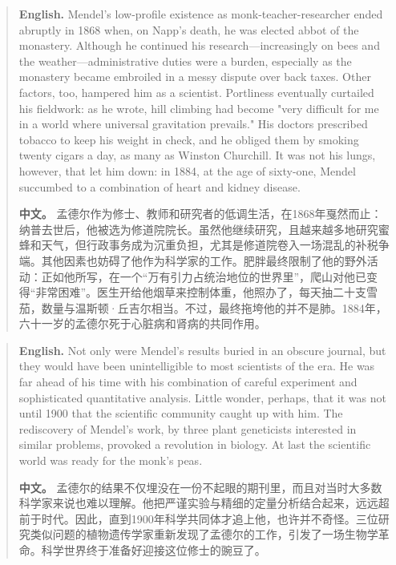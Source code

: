\begin{quote}
\noindent\textbf{English.} Mendel's low-profile existence as monk-teacher-researcher ended abruptly in 1868 when, on Napp's death, he was elected abbot of the monastery. Although he continued his research---increasingly on bees and the weather---administrative duties were a burden, especially as the monastery became embroiled in a messy dispute over back taxes. Other factors, too, hampered him as a scientist. Portliness eventually curtailed his fieldwork: as he wrote, hill climbing had become "very difficult for me in a world where universal gravitation prevails." His doctors prescribed tobacco to keep his weight in check, and he obliged them by smoking twenty cigars a day, as many as Winston Churchill. It was not his lungs, however, that let him down: in 1884, at the age of sixty-one, Mendel succumbed to a combination of heart and kidney disease.

\smallskip
\noindent\textbf{中文。} 孟德尔作为修士、教师和研究者的低调生活，在1868年戛然而止：纳普去世后，他被选为修道院院长。虽然他继续研究，且越来越多地研究蜜蜂和天气，但行政事务成为沉重负担，尤其是修道院卷入一场混乱的补税争端。其他因素也妨碍了他作为科学家的工作。肥胖最终限制了他的野外活动：正如他所写，在一个“万有引力占统治地位的世界里”，爬山对他已变得“非常困难”。医生开给他烟草来控制体重，他照办了，每天抽二十支雪茄，数量与温斯顿·丘吉尔相当。不过，最终拖垮他的并不是肺。1884年，六十一岁的孟德尔死于心脏病和肾病的共同作用。
\end{quote}

\begin{quote}
\noindent\textbf{English.} Not only were Mendel's results buried in an obscure journal, but they would have been unintelligible to most scientists of the era. He was far ahead of his time with his combination of careful experiment and sophisticated quantitative analysis. Little wonder, perhaps, that it was not until 1900 that the scientific community caught up with him. The rediscovery of Mendel's work, by three plant geneticists interested in similar problems, provoked a revolution in biology. At last the scientific world was ready for the monk's peas.

\smallskip
\noindent\textbf{中文。} 孟德尔的结果不仅埋没在一份不起眼的期刊里，而且对当时大多数科学家来说也难以理解。他把严谨实验与精细的定量分析结合起来，远远超前于时代。因此，直到1900年科学共同体才追上他，也许并不奇怪。三位研究类似问题的植物遗传学家重新发现了孟德尔的工作，引发了一场生物学革命。科学世界终于准备好迎接这位修士的豌豆了。
\end{quote}


